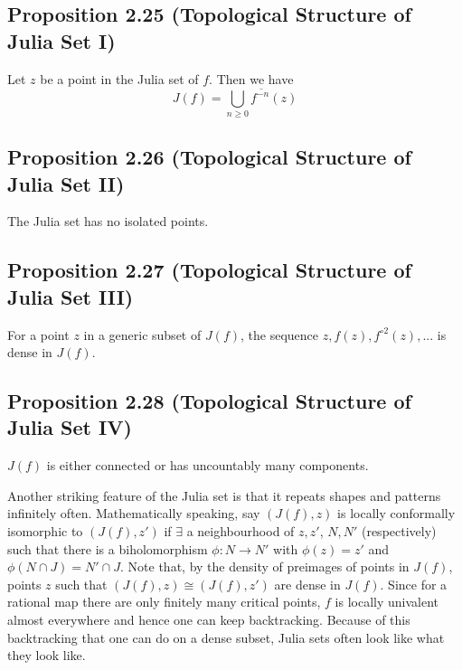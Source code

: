 \documentclass[11pt,a4paper]{article}
\begin{document}
        \subsection*{Proposition 2.25 (Topological Structure of Julia Set I)} Let $z$ be a point in the Julia set of $f$. Then we have $$J(f) = \overline{\bigcup_{n \geq 0}{f^{-n}(z)}}$$


        \subsection*{Proposition 2.26 (Topological Structure of Julia Set II)}  The Julia set has no isolated points.


        \subsection*{Proposition 2.27 (Topological Structure of Julia Set III)} For a point $z$ in a generic subset of $J(f)$, the sequence $z, f(z), f^{\circ 2}(z),...$ is dense in $J(f)$.


        \subsection*{Proposition 2.28 (Topological Structure of Julia Set IV)}  $J(f)$ is either connected or has uncountably many components.



        Another striking feature of the Julia set is that it repeats shapes and patterns infinitely often. Mathematically speaking, say $(J(f), z)$ is locally conformally isomorphic to $(J(f), z')$ if $\exists$ a neighbourhood of $z, z'$, $N, N'$ (respectively) such that there is a biholomorphism $\phi: N \rightarrow N'$ with $\phi(z) = z'$ and $\phi(N\cap J) = N'\cap J$. Note that, by the density of preimages of points in $J(f)$, points $z$ such that $(J(f), z) \cong (J(f), z')$ are dense in $J(f)$. Since for a rational map there are only finitely many critical points, $f$ is locally univalent almost everywhere and hence one can keep backtracking. Because of this backtracking that one can do on a dense subset, Julia sets often look like what they look like.
\end{document}
